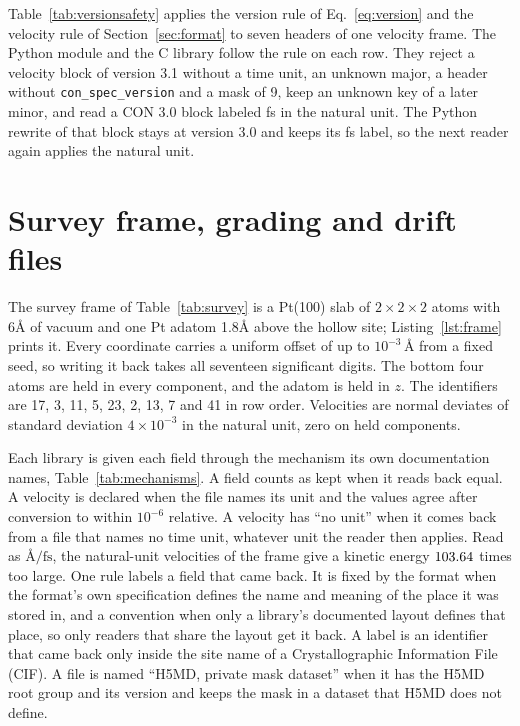 \documentclass[preprint,12pt]{elsarticle}
\begin{document}
Table~\ref{tab:versionsafety} applies the version rule of Eq.~\eqref{eq:version} and the velocity rule of Section~\ref{sec:format} to seven headers of one velocity frame.
The Python module and the C library follow the rule on each row.
They reject a velocity block of version 3.1 without a time unit, an unknown major, a header without \texttt{con\_spec\_version} and a mask of 9, keep an unknown key of a later minor, and read a CON 3.0 block labeled fs in the natural unit.
The Python rewrite of that block stays at version 3.0 and keeps its fs label, so the next reader again applies the natural unit.



\FloatBarrier \section{Survey frame, grading and drift files}\label{sec:supp-failure} The survey frame of Table~\ref{tab:survey} is a Pt(100) slab of \(2\times2\times2\) atoms with 6\hspace*{.2em}\AA{} of vacuum and one Pt adatom 1.8\hspace*{.2em}\AA{} above the hollow site; Listing~\ref{lst:frame} prints it.
Every coordinate carries a uniform offset of up to \(10^{-3}\,\text{\AA}\) from a fixed seed, so writing it back takes all seventeen significant digits.
The bottom four atoms are held in every component, and the adatom is held in \(z\).
The identifiers are 17, 3, 11, 5, 23, 2, 13, 7 and 41 in row order.
Velocities are normal deviates of standard deviation \(4\times10^{-3}\) in the natural unit, zero on held components.

Each library is given each field through the mechanism its own documentation names, Table~\ref{tab:mechanisms}.
A field counts as kept when it reads back equal.
A velocity is declared when the file names its unit and the values agree after conversion to within \(10^{-6}\) relative.
A velocity has ``no unit'' when it comes back from a file that names no time unit, whatever unit the reader then applies.
Read as \(\text{\AA}/\mathrm{fs}\), the natural-unit velocities of the frame give a kinetic energy \(103.64\) times too large.
One rule labels a field that came back.
It is fixed by the format when the format's own specification defines the name and meaning of the place it was stored in, and a convention when only a library's documented layout defines that place, so only readers that share the layout get it back.
A label is an identifier that came back only inside the site name of a Crystallographic Information File (CIF).
A file is named ``H5MD, private mask dataset'' when it has the H5MD root group and its version and keeps the mask in a dataset that H5MD does not define.
\end{document}
